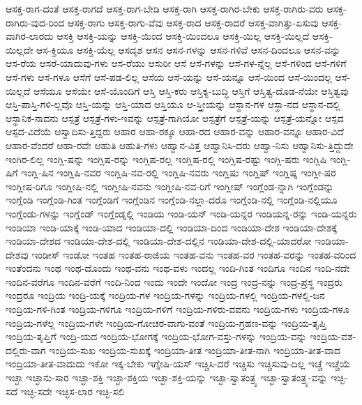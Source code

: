 {ಆಸಕ್ತ-ರಾಗ-ದಂತೆ
ಆಸಕ್ತ-ರಾಗದೆ
ಆಸಕ್ತ-ರಾಗ-ಬೇಡಿ
ಆಸಕ್ತ-ರಾಗಿ
ಆಸಕ್ತ-ರಾಗಿರ-ಬೇಕು
ಆಸಕ್ತ-ರಾಗಿರು-ವರು
ಆಸಕ್ತ-ರಾಗಿರು-ವುದ-ರಿಂದ
ಆಸಕ್ತ-ರಾಗು
ಆಸಕ್ತ-ರಾಗು-ವೆವು
ಆಸಕ್ತ-ರಾದ
ಆಸಕ್ತ-ರಾದರೆ
ಆಸಕ್ತ-ವಾಗಿತ್ತು-ಏಸುವು
ಆಸಕ್ತ-ವಾಗಿರ-ಲಾರದು
ಆಸಕ್ತಿ
ಆಸಕ್ತಿ-ಯನ್ನು
ಆಸಕ್ತಿ-ಯಿಂದ
ಆಸಕ್ತಿ-ಯಿಂದಲೂ
ಆಸಕ್ತಿ-ಯಿಲ್ಲ
ಆಸಕ್ತಿ-ಯಿಲ್ಲದೆ
ಆಸಕ್ತಿ-ಯಿಲ್ಲದೇ
ಆಸ-ಕ್ತಿಯೂ
ಆಸಕ್ತಿ-ಯೆಲ್ಲ
ಆಸದೃಶ
ಆಸನ
ಆಸನ-ಗಳನ್ನು
ಆಸನ-ಗಳಿವೆ
ಆಸನ-ದಿಂದಲೂ
ಆಸನ-ವನ್ನು
ಆಸ-ರೆಯ
ಆಸರೆ-ಯಾದುವು-ಗಳು
ಆಸ-ರೆಯು
ಆಸುರೀ
ಆಸೆ
ಆಸೆ-ಗಳನ್ನು
ಆಸೆ-ಗಳ-ನ್ನೆಲ್ಲ
ಆಸೆ-ಗಳಿಂದ
ಆಸೆ-ಗಳಿಗೆ
ಆಸೆ-ಗಳು
ಆಸೆ-ಗಳೂ
ಆಸೆಗೆ
ಆಸೆ-ಪಡ-ಲಿಲ್ಲ
ಆಸೆಯ
ಆಸೆ-ಯನ್ನು
ಆಸೆ-ಯನ್ನೂ
ಆಸೆ-ಯಿಂದ
ಆಸೆ-ಯಿಂದಲ್ಲ
ಆಸೆ-ಯಿಲ್ಲದೆ
ಆಸೆಯೂ
ಆಸೆಯೇ
ಆಸೆ-ಯೊಂದಿಗೆ
ಆಸ್ತಿ
ಆಸ್ತಿ-ಕರು
ಆಸ್ತಿಕ್ಯ-ಬುದ್ಧಿ
ಆಸ್ತಿಗೆ
ಆಸ್ತಿತ್ವ-ದೊಡ-ನೆಯೇ
ಆಸ್ತಿತ್ವವು
ಆಸ್ತಿ-ಪಾಸ್ತಿ-ಗಳಿ-ಲ್ಲವೊ
ಆಸ್ತಿ-ಯನ್ನು
ಆಸ್ತಿ-ಯಾದ
ಆಸ್ತಿಯೂ
ಆ-ಸ್ತ್ರೀಯನ್ನು
ಆಸ್ಥಾನ-ಗಳ
ಆಸ್ಥಾ-ನದ
ಆಸ್ಥಾನ-ದಲ್ಲಿ
ಆಸ್ಥಾನಿಕ-ನಾದನು
ಆಸ್ಪತ್ರೆ
ಆಸ್ಪತ್ರೆ-ಗಳು-ಇವನ್ನು
ಆಸ್ಪತ್ರೆ-ಗಾಗಿಯೋ
ಆಸ್ಪತ್ರೆಗೆ
ಆಸ್ಪತ್ರೆ-ಯನ್ನು
ಆಸ್ಪತ್ರೆ-ಯನ್ನೋ
ಆಸ್ಪದ
ಆಸ್ಪದ-ವಿದೆಯೆ
ಆಸ್ವಾದಿಸು-ತ್ತಿದ್ದರು
ಆಹಾರ
ಆಹಾ-ರಕ್ಕೂ
ಆಹಾ-ರದ
ಆಹಾರ-ವನ್ನು
ಆಹಾರ-ವನ್ನೂ
ಆಹಾರ-ವಿದೆ
ಆಹಾರ-ವೆಂದರೆ
ಆಹಾ-ರವೇ
ಆಹುತಿ
ಆಹುತಿ-ಗಳು
ಆಹ್ವಾನ-ವಿತ್ತ
ಆಹ್ವಾನಿಸಿ-ದರು
ಆಹ್ವಾ-ನಿಸು
ಆಹ್ವಾನಿಸು-ತ್ತಿದ್ದುದೇ
ಇಂಗಿರ-ಲಿಲ್ಲ
ಇಂಗ್ಲಿ-ಷನ್ನು
ಇಂಗ್ಲಿಷ-ರನ್ನು
ಇಂಗ್ಲಿಷ-ರಲ್ಲ
ಇಂಗ್ಲಿಷ-ರಲ್ಲಿ
ಇಂಗ್ಲಿಷ-ರಷ್ಟು
ಇಂಗ್ಲಿ-ಷರು
ಇಂಗ್ಲಿಷಿ
ಇಂಗ್ಲಿ-ಷಿಗೆ
ಇಂಗ್ಲಿ-ಷಿನ
ಇಂಗ್ಲಿಷಿ-ನವರ
ಇಂಗ್ಲಿಷಿ-ನವ-ರಲ್ಲಿ
ಇಂಗ್ಲಿಷಿ-ನವರು
ಇಂಗ್ಲಿಷು
ಇಂಗ್ಲಿಷ್
ಇಂಗ್ಲಿಷ್ನ
ಇಂಗ್ಲೀ-ಷರ
ಇಂಗ್ಲೀಷ-ರಿಗೂ
ಇಂಗ್ಲೀಷಿ-ನಲ್ಲಿ
ಇಂಗ್ಲೀಷಿ-ನವನು
ಇಂಗ್ಲೀಷಿ-ನವ-ರಿಗೆ
ಇಂಗ್ಲೀಷ್
ಇಂಗ್ಲೆಂಡ-ನ್ನಾಗಿ
ಇಂಗ್ಲೆಂಡನ್ನು
ಇಂಗ್ಲೆಂಡಿ
ಇಂಗ್ಲೆಂಡಿ-ಗಿಂತ
ಇಂಗ್ಲೆಂಡಿಗೆ
ಇಂಗ್ಲೆಂಡಿನ
ಇಂಗ್ಲೆಂಡಿ-ನಲ್ಲಾ-ದರೊ
ಇಂಗ್ಲೆಂಡಿ-ನಲ್ಲಿ
ಇಂಗ್ಲೆಂಡಿ-ನಲ್ಲಿಯೂ
ಇಂಗ್ಲೆಂಡು-ಗಳನ್ನು
ಇಂಗ್ಲೆಂಡ್
ಇಂಗ್ಲೆಂಡ್ನಲ್ಲಿ
ಇಂಡಿಯ
ಇಂಡಿ-ಯನ್
ಇಂಡಿ-ಯನ್ನರ
ಇಂಡಿಯನ್ನ-ರನ್ನು
ಇಂಡಿ-ಯನ್ನರು
ಇಂಡಿಯಾ
ಇಂಡಿ-ಯಾಕ್ಕೆ
ಇಂಡಿ-ಯಾದ
ಇಂಡಿಯಾ-ದಲ್ಲಿ
ಇಂಡಿಯಾ-ದಿಂದ
ಇಂಡಿಯಾ-ದೇಶ
ಇಂಡಿಯಾ-ದೇಶಕ್ಕೆ
ಇಂಡಿಯಾ-ದೇಶದ
ಇಂಡಿಯಾ-ದೇಶ-ದಲ್ಲಿ
ಇಂಡಿಯಾ-ದೇಶ-ದಲ್ಲಿನ
ಇಂಡಿಯಾ-ದೇಶ-ದಲ್ಲಿ-ಯಾದರೋ
ಇಂಡಿಯಾ-ದೇಶವು
ಇಂಡೀಸ್
ಇಂಡೋ
ಇಂತಹ
ಇಂತಹ-ರಾಜಿಯ
ಇಂತಹ-ವನು
ಇಂತಹ-ವರ
ಇಂತಹ-ವರನ್ನು
ಇಂತಹ-ವರಿಂದ
ಇಂತೆಂದನು
ಇಂಥ
ಇಂಥ-ದೊಂದು
ಇಂಥ-ವನು
ಇಂಥ-ವಳು
ಇಂದಲ್ಲ
ಇಂದಿ-ಗಿಂತ
ಇಂದಿಗೂ
ಇಂದಿನ
ಇಂದಿ-ನದೇ
ಇಂದಿನ-ವರೆಗೂ
ಇಂದಿನ-ವರೆಗೆ
ಇಂದಿ-ನಿಂದ
ಇಂದು
ಇಂದೇ
ಇಂದೋ
ಇಂದ್ರ
ಇಂದ್ರ-ನನ್ನು
ಇಂದ್ರ-ಪ್ರಸ್ಥ
ಇಂದ್ರರು
ಇಂದ್ರರೂ
ಇಂದ್ರಿಯ
ಇಂದ್ರಿ-ಯಕ್ಕೆ
ಇಂದ್ರಿಯ-ಗಳ
ಇಂದ್ರಿಯ-ಗಳನ್ನು
ಇಂದ್ರಿಯ-ಗಳಲ್ಲಿ
ಇಂದ್ರಿಯ-ಗಳಲ್ಲಿ-ಜನ
ಇಂದ್ರಿಯ-ಗಳಿ-ಗಿಂತ
ಇಂದ್ರಿಯ-ಗಳಿಗೂ
ಇಂದ್ರಿಯ-ಗಳಿಗೆ
ಇಂದ್ರಿಯ-ಗಳಿರು-ವವನು
ಇಂದ್ರಿಯ-ಗಳು
ಇಂದ್ರಿಯ-ಗಳೂ
ಇಂದ್ರಿಯ-ಗಳೆಲ್ಲ
ಇಂದ್ರಿಯ-ಗಳೇ
ಇಂದ್ರಿಯ-ಗೋಚರ-ವಾಗು-ವಂತೆ
ಇಂದ್ರಿಯ-ಗ್ರಹಣ-ವನ್ನು
ಇಂದ್ರಿಯ-ತೃಪ್ತಿ
ಇಂದ್ರಿಯ-ತೃಪ್ತಿಗೆ
ಇಂದ್ರಿ-ಯದ
ಇಂದ್ರಿಯ-ಭೋಗಕ್ಕೆ
ಇಂದ್ರಿಯ-ಭೋಗ-ವಸ್ತು-ಗಳನ್ನು
ಇಂದ್ರಿಯ-ವನ್ನು
ಇಂದ್ರಿಯ-ವಶ-ದಲ್ಲಿರು-ವಾಗ
ಇಂದ್ರಿಯ-ಸುಖ
ಇಂದ್ರಿಯ-ಸುಖಕ್ಕೆ
ಇಂದ್ರಿಯಾ-ತೀತ
ಇಂದ್ರಿಯಾ-ತೀತ-ನಾಗಿ
ಇಂದ್ರಿಯಾ-ತೀತ-ವಾದ
ಇಂದ್ರಿಯಾ-ತೀತ-ವಾದುದು
ಇಕೋ
ಇಕ್ಕ-ಬೇಕು
ಇಗ್ನೇಷಿ-ಯಸ್
ಇಚ್ಚಿಸಿ-ದರೆ
ಇಚ್ಚಿಸು
ಇಚ್ಚಿಸುವು-ದಿಲ್ಲ
ಇಚ್ಚೆ
ಇಚ್ಚೆಯೆ
ಇಚ್ಛಾ
ಇಚ್ಛಾನು-ಸಾರ
ಇಚ್ಛಾ-ಶಕ್ತಿ
ಇಚ್ಛಾ-ಶಕ್ತಿಯ
ಇಚ್ಛಾ-ಶಕ್ತಿ-ಯನ್ನು
ಇಚ್ಛಾ-ಸ್ವಾತಂತ್ರ್ಯ
ಇಚ್ಛಾ-ಸ್ವಾತಂತ್ರ್ಯ-ವನ್ನು
ಇಚ್ಛಿ-ಸದೆ
ಇಚ್ಛಿ-ಸದೇ
ಇಚ್ಛಿಸ-ಲಾರ
ಇಚ್ಛಿ-ಸಲಿ
}
